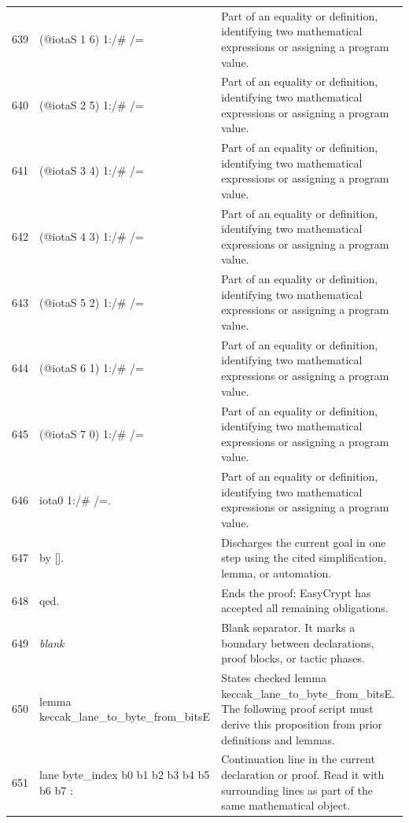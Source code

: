 \documentclass[10pt]{article}
\begin{document}
\begin{longtable}{r L{0.53\textwidth} L{0.37\textwidth}}
639 & {\ttfamily\scriptsize         (@iotaS 1 6) 1:/\# /=} & Part of an equality or definition, identifying two mathematical expressions or assigning a program value. \\
640 & {\ttfamily\scriptsize         (@iotaS 2 5) 1:/\# /=} & Part of an equality or definition, identifying two mathematical expressions or assigning a program value. \\
641 & {\ttfamily\scriptsize         (@iotaS 3 4) 1:/\# /=} & Part of an equality or definition, identifying two mathematical expressions or assigning a program value. \\
642 & {\ttfamily\scriptsize         (@iotaS 4 3) 1:/\# /=} & Part of an equality or definition, identifying two mathematical expressions or assigning a program value. \\
643 & {\ttfamily\scriptsize         (@iotaS 5 2) 1:/\# /=} & Part of an equality or definition, identifying two mathematical expressions or assigning a program value. \\
644 & {\ttfamily\scriptsize         (@iotaS 6 1) 1:/\# /=} & Part of an equality or definition, identifying two mathematical expressions or assigning a program value. \\
645 & {\ttfamily\scriptsize         (@iotaS 7 0) 1:/\# /=} & Part of an equality or definition, identifying two mathematical expressions or assigning a program value. \\
646 & {\ttfamily\scriptsize         iota0 1:/\# /=.} & Part of an equality or definition, identifying two mathematical expressions or assigning a program value. \\
647 & {\ttfamily\scriptsize by [].} & Discharges the current goal in one step using the cited simplification, lemma, or automation. \\
648 & {\ttfamily\scriptsize qed.} & Ends the proof; EasyCrypt has accepted all remaining obligations. \\
649 & {\ttfamily\scriptsize \emph{blank}} & Blank separator.  It marks a boundary between declarations, proof blocks, or tactic phases. \\
650 & {\ttfamily\scriptsize lemma keccak\_lane\_to\_byte\_from\_bitsE} & States checked lemma keccak\_lane\_to\_byte\_from\_bitsE.  The following proof script must derive this proposition from prior definitions and lemmas. \\
651 & {\ttfamily\scriptsize   lane byte\_index b0 b1 b2 b3 b4 b5 b6 b7 :} & Continuation line in the current declaration or proof.  Read it with surrounding lines as part of the same mathematical object. \\

\end{longtable}
\end{document}
